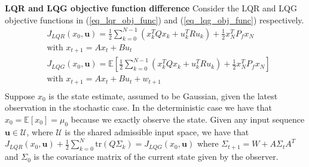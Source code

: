 \begin{thrm}
\textbf{LQR and LQG objective function difference} Consider the LQR and LQG objective functions in (\ref{eq_lqr_obj_func}) and (\ref{eq_lqg_obj_func}) respectively. 
\begin{align}
&J_{LQR}(x_0, \mathbf{u}) = \frac{1}{2}\sum_{k=0}^{N-1} \left( x_k^TQx_k + u_k^TRu_k \right) + \frac{1}{2}x_N^TP_fx_N \label{eq_lqr_obj_func} \\
& \text{with } x_{t+1} = Ax_t +Bu_t \nonumber\\
& J_{LQG}(x_0, \mathbf{u}) =  \mathbb{E}\left[ \frac{1}{2}\sum_{k=0}^{N-1} \left( x_k^TQx_k + u_k^TRu_k \right) + \frac{1}{2}x_N^TP_fx_N \right] \label{eq_lqg_obj_func} \\
& \text{with } x_{t+1} = Ax_t +Bu_t + w_{t+1} \nonumber \\
\end{align}
Suppose $x_0$ is the state estimate, assumed to be Gaussian, given the latest observation in the stochastic case. In the deterministic case we have that $x_0 = \mathbb{E}[x_0] = \mu_0$ because we exactly observe the state. Given any input sequence $\mathbf{u} \in \mathcal{U}$, where $\mathcal{U}$ is the shared admissible input space, we have that $J_{LQR}(x_0, \mathbf{u}) + \frac{1}{2}\sum_{k=0}^N \text{tr}(Q\Sigma_k) = J_{LQG}(x_0, \mathbf{u})$ where $ \Sigma_{t+1} = W+A\Sigma_t A^T$ and $\Sigma_0$ is the covariance matrix of the current state given by the observer.
\label{thrm_lqr_lqg_diff}
\end{thrm}
